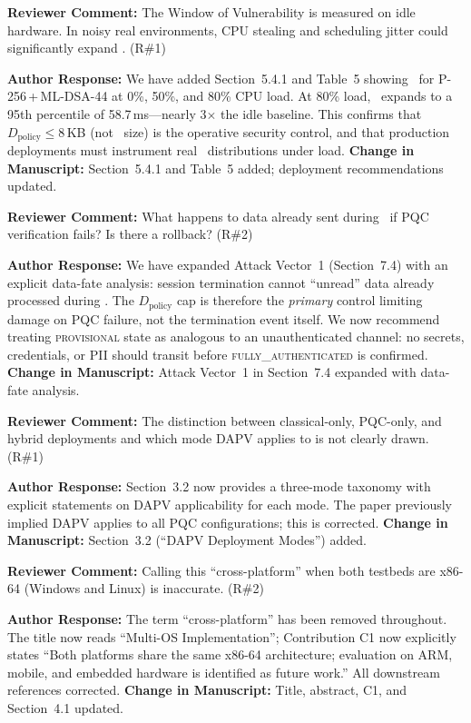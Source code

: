 \documentclass[12pt]{article}
\newcommand{\RC}[1]{\textcolor{reviewerblue}{\textbf{Reviewer Comment:}} #1}
\newcommand{\AR}[1]{\textcolor{replygreen}{\textbf{Author Response:}} #1}
\newcommand{\CH}[1]{\textcolor{changemagenta}{\textbf{Change in Manuscript:}} #1}
\begin{document}
\begin{reviewbox}
\RC{The Window of Vulnerability is measured on idle hardware. In noisy real
environments, CPU stealing and scheduling jitter could significantly expand
\Dt. (R\#1)}
\end{reviewbox}
\begin{replybox}
\AR{We have added Section~5.4.1 and Table~5 showing \Dt\ for P-256\,+\,ML-DSA-44
at 0\%, 50\%, and 80\% CPU load. At 80\% load, \Dt\ expands to a 95th
percentile of 58.7\,ms---nearly 3$\times$ the idle baseline. This confirms
that $D_\text{policy}\leq8$\,KB (not \Dt\ size) is the operative security
control, and that production deployments must instrument real \Dt\
distributions under load.}
\CH{Section~5.4.1 and Table~5 added; deployment recommendations updated.}
\end{replybox}

\begin{reviewbox}
\RC{What happens to data already sent during \Dt\ if PQC verification
fails? Is there a rollback? (R\#2)}
\end{reviewbox}
\begin{replybox}
\AR{We have expanded Attack Vector~1 (Section~7.4) with an explicit data-fate
analysis: session termination cannot ``unread'' data already processed during
\Dt. The $D_\text{policy}$ cap is therefore the \emph{primary} control
limiting damage on PQC failure, not the termination event itself. We now
recommend treating \textsc{provisional} state as analogous to an
unauthenticated channel: no secrets, credentials, or PII should transit before
\textsc{fully\_authenticated} is confirmed.}
\CH{Attack Vector~1 in Section~7.4 expanded with data-fate analysis.}
\end{replybox}

\begin{reviewbox}
\RC{The distinction between classical-only, PQC-only, and hybrid deployments
and which mode DAPV applies to is not clearly drawn. (R\#1)}
\end{reviewbox}
\begin{replybox}
\AR{Section~3.2 now provides a three-mode taxonomy with explicit statements
on DAPV applicability for each mode. The paper previously implied DAPV applies
to all PQC configurations; this is corrected.}
\CH{Section~3.2 (``DAPV Deployment Modes'') added.}
\end{replybox}

\begin{reviewbox}
\RC{Calling this ``cross-platform'' when both testbeds are x86-64 (Windows
and Linux) is inaccurate. (R\#2)}
\end{reviewbox}
\begin{replybox}
\AR{The term ``cross-platform'' has been removed throughout. The title now
reads ``Multi-OS Implementation''; Contribution C1 now explicitly states
``Both platforms share the same x86-64 architecture; evaluation on ARM, mobile,
and embedded hardware is identified as future work.'' All downstream
references corrected.}
\CH{Title, abstract, C1, and Section~4.1 updated.}
\end{replybox}
\end{document}
